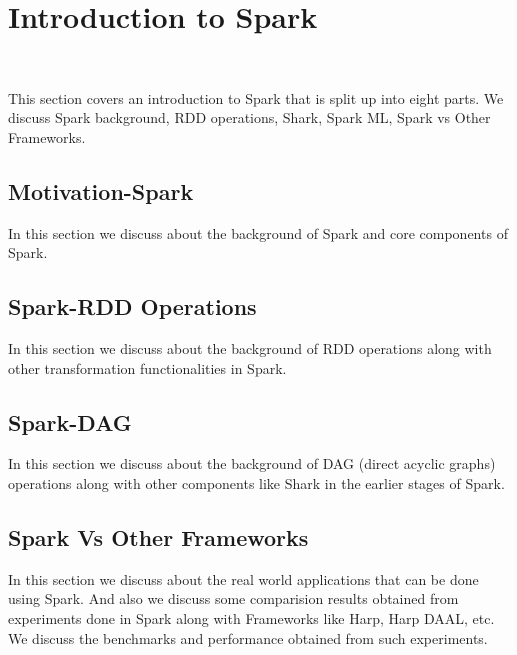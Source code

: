 \section{Introduction to Spark}
\label{c:spark}
\FILENAME\

This section covers an introduction to Spark that is split up
into eight parts. We discuss Spark background, RDD operations,
Shark, Spark ML, Spark vs Other Frameworks.

\subsection{Motivation-Spark}
\label{s:motivation-spark}

In this section we discuss about the background of Spark and
core components of Spark.

\subsection{Spark-RDD Operations}

In this section we discuss about the background of RDD operations
along with other transformation functionalities in Spark.

\subsection{Spark-DAG}

In this section we discuss about the background of DAG (direct acyclic
graphs) operations along with other components like Shark in the
earlier stages of Spark.

\subsection{Spark Vs Other Frameworks}

In this section we discuss about the real world applications that can
be done using Spark.  And also we discuss some comparision results
obtained from experiments done in Spark along with Frameworks like
Harp, Harp DAAL, etc. We discuss the benchmarks and performance
obtained from such experiments.


